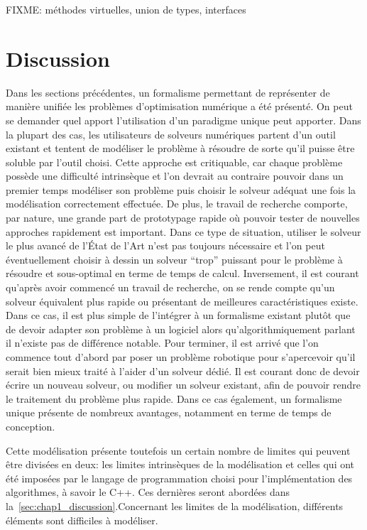 FIXME:  méthodes virtuelles, union de types, interfaces


\section{Discussion}
\label{sec:chap1_discussion}


Dans les sections précédentes, un formalisme permettant de représenter
de manière unifiée les problèmes d'optimisation numérique a été
présenté. On peut se demander quel apport l'utilisation d'un paradigme
unique peut apporter. Dans la plupart des cas, les utilisateurs de
solveurs numériques partent d'un outil existant et tentent de
modéliser le problème à résoudre de sorte qu'il puisse être soluble
par l'outil choisi. Cette approche est critiquable, car chaque problème
possède une difficulté intrinsèque et l'on devrait au contraire
pouvoir dans un premier temps modéliser son problème puis choisir le
solveur adéquat une fois la modélisation correctement effectuée. De
plus, le travail de recherche comporte, par nature, une grande part de
prototypage rapide où pouvoir tester de nouvelles approches rapidement
est important. Dans ce type de situation, utiliser le solveur le plus
avancé de l'État de l'Art n'est pas toujours nécessaire et l'on peut
éventuellement choisir à dessin un solveur ``trop'' puissant pour le
problème à résoudre et sous-optimal en terme de temps de
calcul. Inversement, il est courant qu'après avoir commencé un travail
de recherche, on se rende compte qu'un solveur équivalent plus rapide
ou présentant de meilleures caractéristiques existe. Dans ce cas, il
est plus simple de l'intégrer à un formalisme existant plutôt que de
devoir adapter son problème à un logiciel alors qu'algorithmiquement
parlant il n'existe pas de différence notable. Pour terminer, il est
arrivé que l'on commence tout d'abord par poser un problème robotique
pour s'apercevoir qu'il serait bien mieux traité à l'aider d'un
solveur dédié. Il est courant donc de devoir écrire un nouveau
solveur, ou modifier un solveur existant, afin de pouvoir rendre le
traitement du problème plus rapide. Dans ce cas également, un
formalisme unique présente de nombreux avantages, notamment en terme
de temps de conception.


Cette modélisation présente toutefois un certain nombre de limites qui
peuvent être divisées en deux: les limites intrinsèques de la
modélisation et celles qui ont été imposées par le langage de
programmation choisi pour l'implémentation des algorithmes, à savoir
le C++. Ces dernières seront abordées dans
la \autoref{sec:chap1_discussion}.Concernant les limites de la
modélisation, différents éléments sont difficiles à modéliser.


